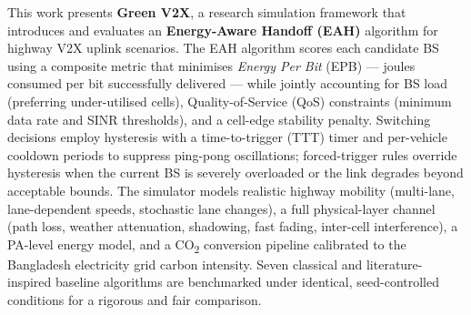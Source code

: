 \documentclass[10pt, a4paper]{article}
\begin{document}
This work presents \textbf{Green V2X}, a research simulation framework that introduces and
evaluates an \textbf{Energy-Aware Handoff (EAH)} algorithm for highway V2X uplink scenarios.
The EAH algorithm scores each candidate BS using a composite metric that minimises
\textit{Energy Per Bit} (EPB) --- joules consumed per bit successfully delivered --- while
jointly accounting for BS load (preferring under-utilised cells), Quality-of-Service (QoS)
constraints (minimum data rate and SINR thresholds), and a cell-edge stability penalty.
Switching decisions employ hysteresis with a time-to-trigger (TTT) timer and per-vehicle
cooldown periods to suppress ping-pong oscillations; forced-trigger rules override hysteresis
when the current BS is severely overloaded or the link degrades beyond acceptable bounds.
The simulator models realistic highway mobility (multi-lane, lane-dependent speeds, stochastic
lane changes), a full physical-layer channel (path loss, weather attenuation, shadowing, fast
fading, inter-cell interference), a PA-level energy model, and a CO\textsubscript{2}
conversion pipeline calibrated to the Bangladesh electricity grid carbon intensity.
Seven classical and literature-inspired baseline algorithms are benchmarked under identical,
seed-controlled conditions for a rigorous and fair comparison.
\end{document}
